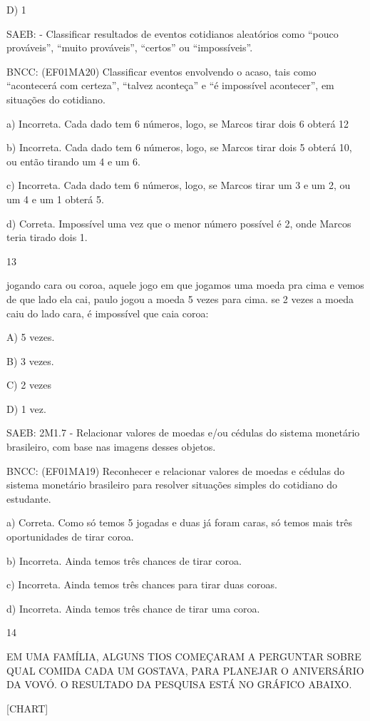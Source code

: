 \begin{itemize}
\begin{itemize}
D) 1

SAEB: - Classificar resultados de eventos cotidianos aleatórios como
``pouco prováveis'', ``muito prováveis'', ``certos'' ou ``impossíveis''.

BNCC: (EF01MA20) Classificar eventos envolvendo o acaso, tais como
``acontecerá com certeza'', ``talvez aconteça'' e ``é impossível
acontecer'', em situações do cotidiano.

a) Incorreta. Cada dado tem 6 números, logo, se Marcos tirar dois 6
obterá 12

b) Incorreta. Cada dado tem 6 números, logo, se Marcos tirar dois 5
obterá 10, ou então tirando um 4 e um 6.

c) Incorreta. Cada dado tem 6 números, logo, se Marcos tirar um 3 e um
2, ou um 4 e um 1 obterá 5.

d) Correta. Impossível uma vez que o menor número possível é 2, onde
Marcos teria tirado dois 1.

\num{13}

jogando cara ou coroa, aquele jogo em que jogamos uma moeda pra cima e
vemos de que lado ela cai, paulo jogou a moeda 5 vezes para cima. se 2
vezes a moeda caiu do lado cara, é impossível que caia coroa:

A) 5 vezes.

B) 3 vezes.

C) 2 vezes

D) 1 vez.

SAEB: 2M1.7 - Relacionar valores de moedas e/ou cédulas do sistema
monetário brasileiro, com base nas imagens desses objetos.

BNCC: (EF01MA19) Reconhecer e relacionar valores de moedas e cédulas do
sistema monetário brasileiro para resolver situações simples do
cotidiano do estudante.

a) Correta. Como só temos 5 jogadas e duas já foram caras, só temos mais
três oportunidades de tirar coroa.

b) Incorreta. Ainda temos três chances de tirar coroa.

c) Incorreta. Ainda temos três chances para tirar duas coroas.

d) Incorreta. Ainda temos três chance de tirar uma coroa.

\num{14}

EM UMA FAMÍLIA, ALGUNS TIOS COMEÇARAM A PERGUNTAR SOBRE QUAL COMIDA CADA
UM GOSTAVA, PARA PLANEJAR O ANIVERSÁRIO DA VOVÓ. O RESULTADO DA PESQUISA
ESTÁ NO GRÁFICO ABAIXO.

{{[}CHART{]}}


\end{itemize}
\end{itemize}
